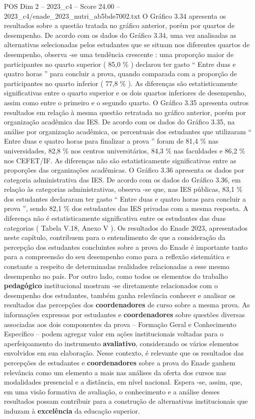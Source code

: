 \begin{textsample}{POS Dim 2 – 2023\_c4 – Score 24.00 – 2023\_c4/enade\_2023\_nutri\_ab5bde7002.txt}
O Gráfico 3.34 apresenta os resultados sobre a questão tratada no gráfico anterior, porém por quartos de desempenho.
De acordo com os dados do Gráfico 3.34, uma vez analisadas as alternativas selecionadas pelos estudantes que se situam nos diferentes quartos de desempenho, observa -se uma tendência crescente : uma proporção maior de participantes no quarto superior ( 85,0 \% ) declarou ter gasto “ Entre duas e quatro horas ” para concluir a prova, quando comparada com a proporção de participantes no quarto inferior ( 77,8 \% ).
As diferenças são estatisticamente significativas entre o quarto superior e os dois quartos inferiores de desempenho, assim como entre o primeiro e o segundo quarto.
O Gráfico 3.35 apresenta outros resultados em relação à mesma questão retratada no gráfico anterior, porém por organização acadêmica das IES.
De acordo com os dados do Gráfico 3.35, na análise por organização acadêmica, os percentuais dos estudantes que utilizaram “ Entre duas e quatro horas para finalizar a prova ” foram de 81,4 \% nas universidades, 82,8 \% nos centros universitários, 84,3 \% nas faculdades e 86,2 \% nos CEFET/IF.
As diferenças não são estatisticamente significativas entre as proporções das organizações acadêmicas.
O Gráfico 3.36 apresenta os dados por categoria administrativa das IES.
De acordo com os dados do Gráfico 3.36, em relação às categorias administrativas, observa -se que, nas IES públicas, 83,1 \% dos estudantes declararam ter gasto “ Entre duas e quatro horas para concluir a prova ”, sendo 82,1 \% dos estudantes das IES privadas com a mesma resposta.
A diferença não é estatisticamente significativa entre os estudantes das duas categorias ( Tabela V.18, Anexo V ).
Os resultados do Enade 2023, apresentados neste capítulo, contribuem para o entendimento de que a consideração da percepção dos estudantes concluintes sobre a prova do Enade é importante tanto para a compreensão do seu desempenho como para a reflexão sistemática e constante a respeito de determinadas realidades relacionadas a esse mesmo desempenho no país.
Por outro lado, como todos os elementos do trabalho \textbf{pedagógico} institucional mostram -se diretamente relacionados com o desempenho dos estudantes, também ganha relevância conhecer e analisar os resultados das percepções dos \textbf{coordenadores} de curso sobre a mesma prova.
As informações expressas por estudantes e \textbf{coordenadores} sobre questões diversas associadas aos dois componentes da prova – Formação Geral e Conhecimento Específico – podem agregar valor em ações institucionais voltadas para o aperfeiçoamento do instrumento \textbf{avaliativo}, considerando os vários elementos envolvidos em sua elaboração.
Nesse contexto, é relevante que os resultados das percepções de estudantes e \textbf{coordenadores} sobre a prova do Enade ganhem relevância como um elemento a mais nas análises da oferta dos cursos nas modalidades presencial e a distância, em nível nacional.
Espera -se, assim, que, em uma visão formativa de avaliação, o conhecimento e a análise desses resultados possam contribuir para a construção de alternativas institucionais que induzam à \textbf{excelência} da educação superior.


\end{textsample}
